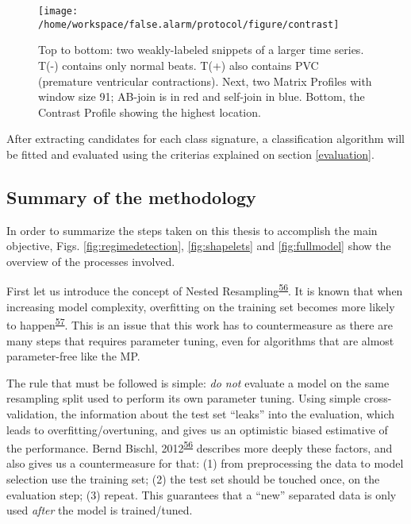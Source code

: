 \documentclass[12pt,twoside]{fmupthesis}
\begin{document}
\hfill\break
\begin{figure}

{\centering \texttt{[image: /home/workspace/false.alarm/protocol/figure/contrast]} 

}

\caption{Top to bottom: two weakly-labeled snippets of a larger time series. T(-) contains only normal beats. T(+) also contains PVC (premature ventricular contractions). Next, two Matrix Profiles with window size 91; AB-join is in red and self-join in blue. Bottom, the Contrast Profile showing the highest location.}\label{fig:contrast}
\end{figure}
After extracting candidates for each class signature, a classification algorithm will be fitted and
evaluated using the criterias explained on section \ref{evaluation}.

\hypertarget{summary-of-the-methodology}{%
\subsection{Summary of the methodology}\label{summary-of-the-methodology}}

In order to summarize the steps taken on this thesis to accomplish the main objective, Figs.
\ref{fig:regimedetection}, \ref{fig:shapelets} and \ref{fig:fullmodel} show the overview of the
processes involved.

First let us introduce the concept of Nested Resampling\textsuperscript{\protect\hyperlink{ref-Bischl2012}{56}}. It is known that when
increasing model complexity, overfitting on the training set becomes more likely to happen\textsuperscript{\protect\hyperlink{ref-Hastie2009}{57}}. This is an issue that this work has to countermeasure as there are many steps that
requires parameter tuning, even for algorithms that are almost parameter-free like the MP.

The rule that must be followed is simple: \emph{do not} evaluate a model on the same resampling split used
to perform its own parameter tuning. Using simple cross-validation, the information about the test
set ``leaks'' into the evaluation, which leads to overfitting/overtuning, and gives us an optimistic
biased estimative of the performance. Bernd Bischl, 2012\textsuperscript{\protect\hyperlink{ref-Bischl2012}{56}} describes more deeply these
factors, and also gives us a countermeasure for that: (1) from preprocessing the data to model
selection use the training set; (2) the test set should be touched once, on the evaluation step; (3)
repeat. This guarantees that a ``new'' separated data is only used \emph{after} the model is trained/tuned.
\end{document}
